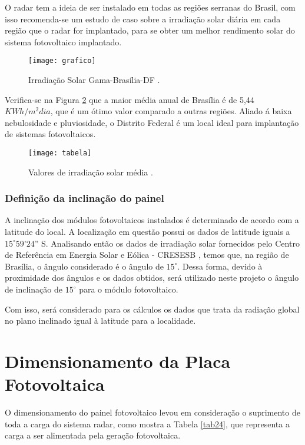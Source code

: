 O radar tem a ideia de ser instalado em todas as regiões serranas do Brasil, com isso recomenda-se um estudo de caso sobre a irradiação solar diária em cada região que o radar for implantado, para se obter um melhor rendimento solar do sistema fotovoltaico implantado. 
\begin{figure}[H]
\centering
\texttt{[image: grafico]}
\caption{Irradiação Solar Gama-Brasília-DF \cite{solar}.}
\label{fig:grafico}
\end{figure}

Verifica-se na Figura \ref{fig:tabela} que a maior média anual de Brasília é de 5,44 $KWh/m^2dia$, que é um ótimo valor comparado a outras regiões. Aliado á baixa nebulosidade e pluviosidade, o Distrito Federal é um local ideal para implantação de sistemas fotovoltaicos.

\begin{figure}[H]
\centering
\texttt{[image: tabela]}
\caption{Valores de irradiação solar média \cite{solar}.}
\label{fig:tabela}
\end{figure}

\subsubsection{Definição da inclinação do painel}

A inclinação dos módulos fotovoltaicos instalados é determinado de acordo com a latitude do local. A localização em questão possui os dados de latitude iguais a $15^{\circ}59’24”$ S. Analisando então os dados de irradiação solar fornecidos pelo Centro de Referência em Energia Solar e Eólica - CRESESB \cite{solar}, temos que, na região de Brasília, o ângulo considerado é o ângulo de $15^{\circ}$. Dessa forma, devido à proximidade dos ângulos e os dados obtidos, será utilizado neste projeto o ângulo de inclinação de $15^{\circ}$ para o módulo fotovoltaico.

Com isso, será considerado para os  cálculos os dados que  trata da radiação global no plano inclinado  igual à latitude para a localidade.
 
 
\section{Dimensionamento da Placa Fotovoltaica}

O dimensionamento do painel fotovoltaico levou em consideração o suprimento de toda a carga do sistema radar, como mostra a Tabela \ref{tab24}, que representa a carga a ser alimentada pela geração fotovoltaica. 

